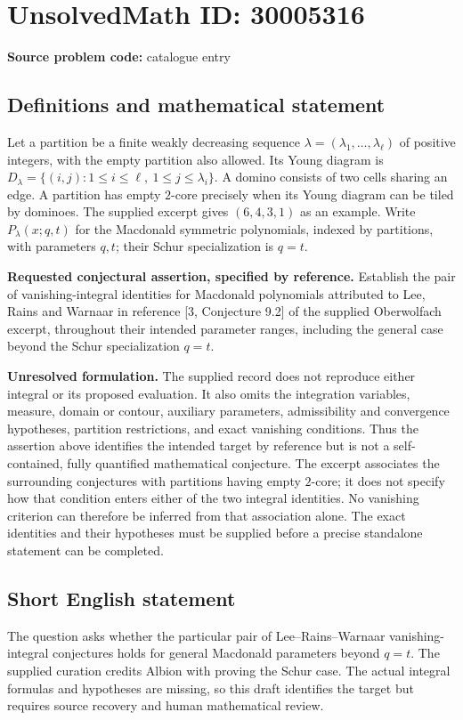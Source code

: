 \documentclass[11pt]{article}
\begin{document}
\section*{UnsolvedMath ID: 30005316}
\textbf{Source problem code:} catalogue entry
\subsection{Definitions and mathematical statement}
Let a partition be a finite weakly decreasing sequence \(\lambda=(\lambda_1,\ldots,\lambda_\ell)\) of positive integers, with the empty partition also allowed. Its Young diagram is \(D_\lambda=\{(i,j):1\le i\le\ell,\ 1\le j\le\lambda_i\}\). A domino consists of two cells sharing an edge. A partition has empty \(2\)-core precisely when its Young diagram can be tiled by dominoes. The supplied excerpt gives \((6,4,3,1)\) as an example. Write \(P_\lambda(x;q,t)\) for the Macdonald symmetric polynomials, indexed by partitions, with parameters \(q,t\); their Schur specialization is \(q=t\).

\textbf{Requested conjectural assertion, specified by reference.} Establish the pair of vanishing-integral identities for Macdonald polynomials attributed to Lee, Rains and Warnaar in reference [3, Conjecture 9.2] of the supplied Oberwolfach excerpt, throughout their intended parameter ranges, including the general case beyond the Schur specialization \(q=t\).

\textbf{Unresolved formulation.} The supplied record does not reproduce either integral or its proposed evaluation. It also omits the integration variables, measure, domain or contour, auxiliary parameters, admissibility and convergence hypotheses, partition restrictions, and exact vanishing conditions. Thus the assertion above identifies the intended target by reference but is not a self-contained, fully quantified mathematical conjecture. The excerpt associates the surrounding conjectures with partitions having empty \(2\)-core; it does not specify how that condition enters either of the two integral identities. No vanishing criterion can therefore be inferred from that association alone. The exact identities and their hypotheses must be supplied before a precise standalone statement can be completed.
\subsection{Short English statement}
The question asks whether the particular pair of Lee--Rains--Warnaar vanishing-integral conjectures holds for general Macdonald parameters beyond \(q=t\). The supplied curation credits Albion with proving the Schur case. The actual integral formulas and hypotheses are missing, so this draft identifies the target but requires source recovery and human mathematical review.
\end{document}
